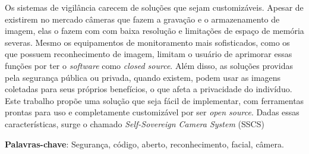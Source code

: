\documentclass[12pt, %
openright, 
oneside, %
a4paper,    %
brazil]{facom-ufu-abntex2}
\begin{document}



\begin{resumo} %
	Os sistemas de vigilância carecem de soluções
	que sejam customizáveis. Apesar de existirem no mercado câmeras que fazem a gravação e o armazenamento de
	imagem, elas o fazem com com baixa resolução e limitações de espaço de memória severas. Mesmo os equipamentos
	de monitoramento mais sofisticados, como os que possuem reconhecimento de imagem, limitam o usuário de aprimorar
	essas funções por ter o \textit{\foreignlanguage{english}{software}} como \textit{\foreignlanguage{english}{closed source}}.
	Além disso, as soluções providas pela segurança pública ou privada, quando existem, podem usar as imagens
	coletadas para seus próprios benefícios, o que afeta a privacidade do indivíduo. Este trabalho propõe uma solução que seja
	fácil de implementar, com ferramentas prontas para uso e completamente customizável por ser \textit{\foreignlanguage{english}{open source}}.
	Dadas essas características, surge o chamado \textit{\foreignlanguage{english}{Self-Sovereign Camera System}} (SSCS)
	\vspace{\onelineskip}

	\noindent
	\textbf{Palavras-chave}: Segurança, código,  aberto, reconhecimento, facial, câmera.  %
\end{resumo}
\end{document}
